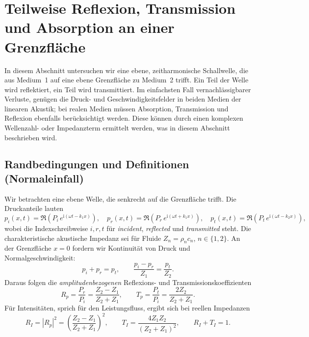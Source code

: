 %
%
%
%
\section{Teilweise Reflexion, Transmission und Absorption an einer Grenzfläche
\label{schall:section:teil2}}


In diesem Abschnitt untersuchen wir eine ebene, zeit\-harmonische Schallwelle,
die aus Medium~1 auf eine ebene Grenzfläche zu Medium~2 trifft.
Ein Teil der Welle wird reflektiert, ein Teil wird transmittiert.
Im einfachsten Fall vernachlässigbarer Verluste, genügen die Druck- und
Geschwindigkeitsfelder in beiden Medien der linearen Akustik;
bei realen Medien müssen Absorption, Transmission und Reflexion ebenfalls
berücksichtigt werden.
Diese können durch einen komplexen Wellenzahl- oder Impedanzterm
ermittelt werden, was in diesem Abschnitt beschrieben wird.

\subsection{Randbedingungen und Definitionen (Normal\-einfall)}
Wir betrachten eine ebene Welle, die senkrecht auf die Grenzfläche trifft.
Die Druckanteile lauten
\[
    p_i(x,t)=\Re( P_i\,e^{\mathrm{i}(\omega t-k_1 x)}),\quad
    p_r(x,t)=\Re( P_r\,e^{\mathrm{i}(\omega t+k_1 x)}),\quad
    p_t(x,t)=\Re( P_t\,e^{\mathrm{i}(\omega t-k_2 x)}),
\]
wobei die Indexschreibweise $i,r,t$ für \emph{incident}, \emph{reflected} und \emph{transmitted} steht.
Die charakteristische akustische Impedanz sei für Fluide $Z_n=\rho_n c_n$, $n\in\{1,2\}$.
An der Grenzfläche $x=0$ fordern wir Kontinuität von Druck und Normalgeschwindigkeit:
\[
    p_i+p_r=p_t,\qquad \frac{p_i-p_r}{Z_1}=\frac{p_t}{Z_2}.
\]
Daraus folgen die \emph{amplitudenbezogenen} Reflexions- und Transmissionskoeffizienten
\begin{equation}
    R_p=\frac{P_r}{P_i}=\frac{Z_2-Z_1}{Z_2+Z_1},
    \qquad
    T_p=\frac{P_t}{P_i}=\frac{2Z_2}{Z_2+Z_1}.
    \label{eq:RpTp}
\end{equation}
Für Intensitäten, sprich für den Leistungsfluss, ergibt sich bei reellen Impedanzen \cite{schall:kinsler, schall:allenRT}
\begin{equation}
    R_I=\left|R_p\right|^2=\left(\frac{Z_2-Z_1}{Z_2+Z_1}\right)^2,\qquad
    T_I=\frac{4Z_1Z_2}{(Z_2+Z_1)^2},
    \qquad
    R_I+T_I=1.
    \label{eq:RI_TI}
\end{equation}

